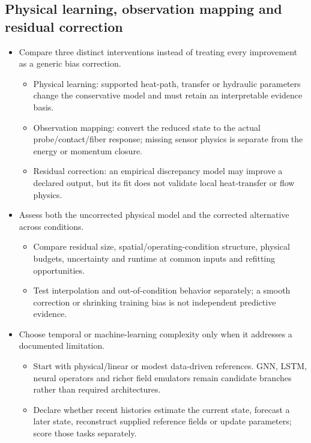 \subsection{Physical learning, observation mapping and residual correction}\label{subsec:physical-learning-observation-mapping-and-residual-correction}

\begin{itemize}[leftmargin=*]
\item Compare three distinct interventions instead of treating every improvement as a generic bias correction.
\begin{itemize}
\item Physical learning: supported heat-path, transfer or hydraulic parameters change the conservative model and must retain an interpretable evidence basis.
\item Observation mapping: convert the reduced state to the actual probe/\allowbreak{}contact/\allowbreak{}fiber response; missing sensor physics is separate from the energy or momentum closure.
\item Residual correction: an empirical discrepancy model may improve a declared output, but its fit does not validate local heat-transfer or flow physics.
\end{itemize}
\item Assess both the uncorrected physical model and the corrected alternative across conditions.
\begin{itemize}
\item Compare residual size, spatial/\allowbreak{}operating-condition structure, physical budgets, uncertainty and runtime at common inputs and refitting opportunities.
\item Test interpolation and out-of-condition behavior separately; a smooth correction or shrinking training bias is not independent predictive evidence.
\end{itemize}
\item Choose temporal or machine-learning complexity only when it addresses a documented limitation.
\begin{itemize}
\item Start with physical/\allowbreak{}linear or modest data-driven references. GNN, LSTM, neural operators and richer field emulators remain candidate branches rather than required architectures.
\item Declare whether recent histories estimate the current state, forecast a later state, reconstruct supplied reference fields or update parameters; score those tasks separately.
\end{itemize}


\end{itemize}
